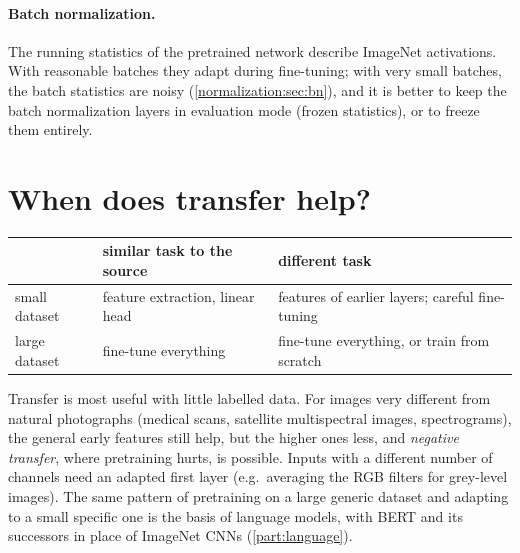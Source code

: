 \begin{notechapter}
\paragraph{Batch normalization.} The running statistics of the pretrained network describe
ImageNet activations. With reasonable batches they adapt during fine-tuning; with very
small batches, the batch statistics are noisy (\cref{normalization:sec:bn}), and it is better to
keep the batch normalization layers in evaluation mode (frozen statistics), or to freeze them
entirely.

\section{When does transfer help?}\label{transfer-learning:sec:when}

\begin{center}\small
\begin{tabular}{lp{4.6cm}p{4.6cm}}
\toprule
& similar task to the source & different task \\
\midrule
small dataset & feature extraction, linear head & features of earlier layers; careful fine-tuning \\
large dataset & fine-tune everything & fine-tune everything, or train from scratch \\
\bottomrule
\end{tabular}
\end{center}

Transfer is most useful with little labelled data. For images very different from natural
photographs (medical scans, satellite multispectral images, spectrograms), the general
early features still help, but the higher ones less, and \emph{negative transfer}, where
pretraining hurts, is possible. Inputs with a different number of channels need an adapted
first layer (e.g.\ averaging the RGB filters for grey-level images). The same pattern of
pretraining on a large generic dataset and adapting to a small specific one is the basis of
language models, with BERT and its successors in place of ImageNet CNNs
(\cref{part:language}).


\end{notechapter}
